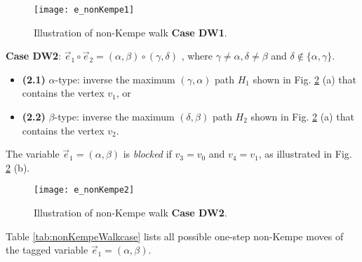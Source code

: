 \documentclass[11pt]{article}
\begin{document}
\begin{figure}[htpb]
	\centering
	\texttt{[image: e\_nonKempe1]}
	\caption{Illustration of non-Kempe walk {\bf Case DW1}.}
	\label{fig:nonKempe1}
\end{figure}

{\bf Case DW2}: $\vec{e}_1 \circ \vec{e}_2 =(\alpha,\beta) \circ (\gamma,\delta)$ , where $\gamma \neq \alpha , \delta \neq \beta$ and $\delta \notin \{\alpha, \gamma \}$.
\begin{itemize}  
\itemsep -2pt 
\item {\bf (2.1)} $\alpha$-type: inverse the maximum $(\gamma,\alpha)$ path $H_1$ shown in Fig. \ref{fig:nonKempe2} (a) that contains the vertex $v_1$, or
\item {\bf (2.2)} $\beta$-type: inverse the maximum $(\delta,\beta)$ path $H_2$ shown in Fig. \ref{fig:nonKempe2} (a) that contains the vertex $v_2$.
\end{itemize}

The variable $\vec{e}_1=(\alpha,\beta)$  is {\it blocked} if $v_3=v_0$  and $v_4=v_1$, as illustrated in Fig. \ref{fig:nonKempe2} (b). 



\begin{figure}[htpb]
	\centering
	\texttt{[image: e\_nonKempe2]}
	\caption{Illustration of non-Kempe walk {\bf Case DW2}.}
	\label{fig:nonKempe2}
\end{figure}

Table \ref{tab:nonKempeWalkcase} lists all possible one-step non-Kempe moves of the tagged variable $\vec{e}_1=(\alpha,\beta)$.
\end{document}
